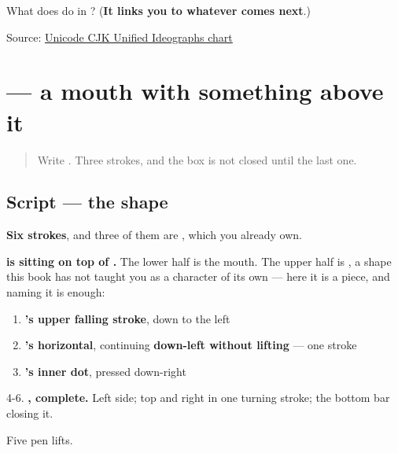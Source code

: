 \begin{tcolorbox}[breakable,colback=teal!4,colframe=teal!35!black,title={Before you move on}]
What does  do in ? (\textbf{It links you to whatever comes next}.)

Source: \href{https://www.unicode.org/charts/PDF/U4E00.pdf}{Unicode CJK Unified Ideographs chart}
\end{tcolorbox}
\section[\texorpdfstring{\zh{名} (míng)}{名 (míng)}]{ — a mouth with something above it}

\label{lesson:ZH-W08-ming}



\begin{quote}
Write . Three strokes, and the box is not closed until the last one.
\end{quote}

\subsection*{Script — the shape}

\begin{quote}
\end{quote}

\textbf{Six strokes}, and three of them are , which you already own.

\textbf{ is  sitting on top of .} The lower half is the mouth. The upper half is \textbf{}, a shape this book has not taught you as a character of its own — here it is a piece, and naming it is enough:

\begin{enumerate}
\raggedright
  \item \textbf{'s upper falling stroke}, down to the left
  \item \textbf{'s horizontal}, continuing \textbf{down-left without lifting} — one stroke
  \item \textbf{'s inner dot}, pressed down-right
\end{enumerate}

4-6. \textbf{, complete.} Left side; top and right in one turning stroke; the bottom bar closing it.

Five pen lifts.

